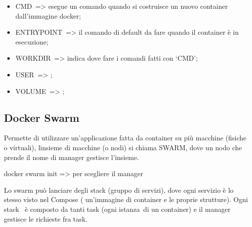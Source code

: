 \documentclass[
]{article}
\providecommand{\tightlist}{%
  \setlength{\itemsep}{0pt}\setlength{\parskip}{0pt}}
\begin{document}
\begin{itemize}
\tightlist
\item
  {CMD}{~=\textgreater{} esegue un comando quando si costruisce un nuovo
  container dall'immagine docker;}
\end{itemize}

{}

\begin{itemize}
\tightlist
\item
  {ENTRYPOINT}{~=\textgreater{} il comando di default da fare quando il
  container è in esecuzione;}
\end{itemize}

{}

\begin{itemize}
\tightlist
\item
  {WORKDIR}{~=\textgreater{} indica dove fare i comandi fatti con
  `CMD';}
\end{itemize}

{}

\begin{itemize}
\tightlist
\item
  {USER}{~=\textgreater{} ;}
\end{itemize}

{}

\begin{itemize}
\tightlist
\item
  {VOLUME}{~=\textgreater{} ;}
\end{itemize}

{}

{}

\subsection{\texorpdfstring{{Docker
Swarm}}{Docker Swarm}}\label{h.v458pgb2juyv}

{Permette di utilizzare un'applicazione fatta da container su più
macchine (fisiche o virtuali), l\textquotesingle insieme di macchine (o
nodi) si chiama SWARM, dove un nodo che prende il nome di manager
gestisce l'insieme.}

{}

{docker swarm init =\textgreater{} per scegliere il manager}

{}

{Lo swarm può lanciare degli stack (gruppo di servizi), dove ogni
servizio è lo stesso visto nel Compose ( un'immagine di container e le
proprie strutture). Ogni stack ~è composto da tanti task (ogni
}{istanza}{~di un container) e il manager gestisce le richieste fra
task.}
\end{document}
